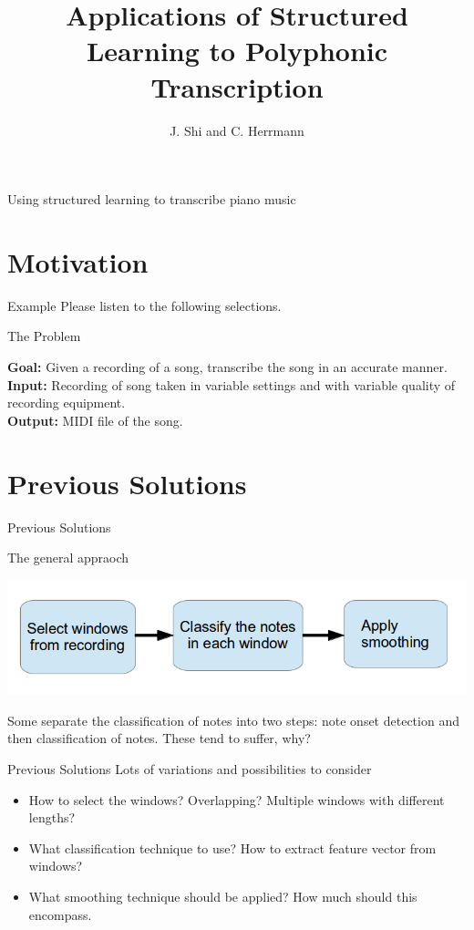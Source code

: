 \documentclass{beamer}
\title{Applications of Structured Learning to Polyphonic Transcription}
\author[]{J. Shi and C. Herrmann}
\institute[]{Presented for Advanced Topics in Machine Learning}
\begin{document}
\begin{frame}{}
\titlepage
Using structured learning to transcribe piano music
\end{frame}



\section{Motivation}
\begin{frame}{Example}
Please listen to the following selections.
\end{frame}

\begin{frame}{The Problem}

{\bf Goal:} Given a recording of a song, transcribe the song in an accurate manner.\\
\vspace{.5cm}
{\bf Input:} Recording of song taken in variable settings and with variable quality of recording equipment.\\
\vspace{.1cm}
{\bf Output:} MIDI file of the song.
\end{frame}

\section{Previous Solutions}
\begin{frame}{Previous Solutions}

The general appraoch

\includegraphics[scale=.4]{algorithm_template.png}

Some separate the classification of notes into two steps: note onset detection and then classification of notes. These tend to suffer, why?
\end{frame}

\begin{frame}{Previous Solutions}
Lots of variations and possibilities to consider
\begin{itemize}
\item How to select the windows? Overlapping? Multiple windows with different lengths?
\item What classification technique to use? How to extract feature vector from windows?
\item What smoothing technique should be applied? How much should this encompass.
\end{itemize}
\end{frame}
\end{document}
